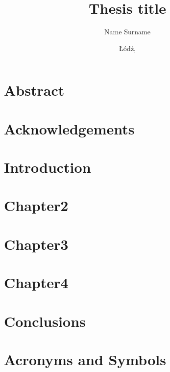 \documentclass[a4paper,12pt,twoside]{extreport}
\title{Thesis title}
\author{Name Surname}
\date{\L{}\'od\'z, \mydate}
\begin{document}


\thispagestyle{plain}
\null\newpage

\chapter*{Abstract}


\chapter*{Acknowledgements}


\chapter*{}


\tableofcontents
{}
\null\newpage

\chapter{Introduction}


\chapter{Chapter2}


\chapter{Chapter3}


\chapter{Chapter4}


\chapter{Conclusions}


\appendix
\chapter{Acronyms and Symbols}


\printbibliography[heading=bibintoc]

\newpage
\listoffigures

\newpage
\listofcodes

\newpage
\listoftables
\end{document}
